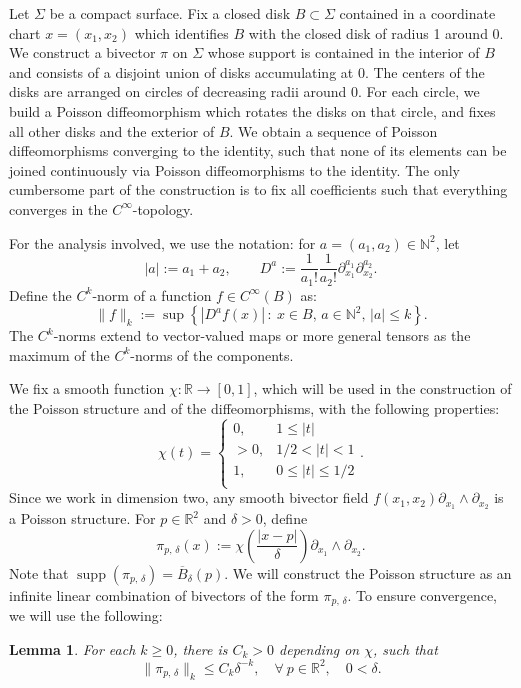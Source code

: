 \documentclass[10pt]{amsart}
\newtheorem{lemm}[cdrthm]{Lemma}
\theoremstyle{definition}
\newcommand{\R}{\mathbb{R}}
\newcommand{\N}{\mathbb{N}}
\newcommand{\norm}[1]{\|#1\|}
\DeclareMathOperator{\supp}{supp}
\let\oldforall\forall
\renewcommand*{\forall}{\mathrel{\oldforall}}
\begin{document}
Let $\Sigma$ be a compact surface. Fix a closed disk $B\subset \Sigma$ contained in a coordinate chart $x=(x_1,x_2)$ which identifies $B$ with the closed disk of radius 1 around 0. We construct a bivector $\pi$ on $\Sigma$ whose support is contained in the interior of $B$ and consists of a disjoint union of disks accumulating at $0$. The centers of the disks are arranged on circles of decreasing radii around $0$. For each circle, we build a Poisson diffeomorphism which rotates the disks on that circle, and fixes all other disks and the exterior of $B$. We obtain a sequence of Poisson diffeomorphisms converging to the identity, such that none of its elements can be joined continuously via Poisson diffeomorphisms to the identity. The only cumbersome part of the construction is to fix all coefficients such that everything converges in the $C^{\infty}$-topology.

For the analysis involved, we use the notation: for $a=(a_1,a_2)\in \N^2$, let
\[
|a|:=a_1+a_2, \qquad D^a:=\frac{1}{a_1!}\frac{1}{a_2!}\partial_{x_1}^{a_1}\partial_{x_2}^{a_2}.
\]
Define the $C^k$-norm of a function $f\in C^{\infty}(B)$ as:
\[
\norm{f}_k:=\sup\left\{\left|D^a f(x)\right|\, : \ x\in B, \, a\in \N^2, \, |a|\leq k\right\}.
\]
The $C^k$-norms extend to vector-valued maps or more general tensors as the maximum of the $C^k$-norms of the components.

We fix a smooth function $\chi:\R\to [0,1]$, which will be used in the construction of the Poisson structure and of the diffeomorphisms, with the following properties:
\[
\chi(t)=
\begin{cases} 0, & 1\leq |t| \\
>0, & 1/2 < |t|<1\\
1, & 0 \leq |t|\leq 1/2\\
\end{cases}.
\]
Since we work in dimension two, any smooth bivector field $f(x_1,x_2)\partial_{x_1}\wedge \partial_{x_2}$ is a Poisson structure. For $p\in \R^2$ and $\delta>0$, define
\[
\pi_{p,\,\delta}(x):=\chi\left(\frac{|x-p|}{\delta}\right)\partial_{x_1}\wedge\partial_{x_2}.
\]
Note that $\supp(\pi_{p,\,\delta})=\overline{B}_\delta(p)$. We will construct the Poisson structure as an infinite linear combination of bivectors of the form $\pi_{p,\,\delta}$. To ensure convergence, we will use the following:

\begin{lemm}\label{lemma_bivector}
For each $k\geq 0$, there is $C_k>0$ depending on $\chi$, such that
\[
\norm{\pi_{p,\,\delta}}_{k}\leq C_k \delta^{-k}, \quad \forall \ p\in \R^2,\quad 0<\delta.
\]
\end{lemm}
\end{document}
